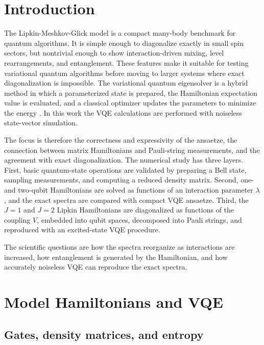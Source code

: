 \documentclass[10pt,a4paper]{article}
\begin{document}
\section{Introduction}

The Lipkin-Meshkov-Glick model is a compact many-body benchmark for quantum algorithms. It is simple enough to diagonalize exactly in small spin sectors, but nontrivial enough to show interaction-driven mixing, level rearrangements, and entanglement. These features make it suitable for testing variational quantum algorithms before moving to larger systems where exact diagonalization is impossible. The variational quantum eigensolver is a hybrid method in which a parameterized state is prepared, the Hamiltonian expectation value is evaluated, and a classical optimizer updates the parameters to minimize the energy \cite{peruzzo2014vqe}. In this work the VQE calculations are performed with noiseless state-vector simulation.

The focus is therefore the correctness and expressivity of the ansaetze, the connection between matrix Hamiltonians and Pauli-string measurements, and the agreement with exact diagonalization. The numerical study has three layers. First, basic quantum-state operations are validated by preparing a Bell state, sampling measurements, and computing a reduced density matrix. Second, one- and two-qubit Hamiltonians are solved as functions of an interaction parameter $\lambda$, and the exact spectra are compared with compact VQE ansaetze. Third, the $J=1$ and $J=2$ Lipkin Hamiltonians are diagonalized as functions of the coupling $V$, embedded into qubit spaces, decomposed into Pauli strings, and reproduced with an excited-state VQE procedure.

The scientific questions are how the spectra reorganize as interactions are increased, how entanglement is generated by the Hamiltonian, and how accurately noiseless VQE can reproduce the exact spectra.

\section{Model Hamiltonians and VQE}\label{sec:methods}

\subsection{Gates, density matrices, and entropy}
\end{document}
